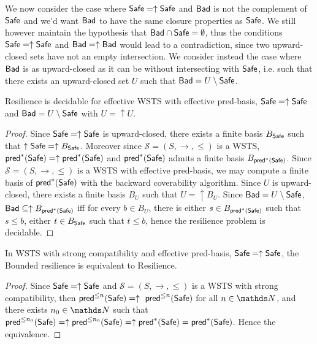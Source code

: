 We now consider the case where $\textsf{Safe} = \uparrow \textsf{Safe}$ and $\textsf{Bad}$ is not the complement of 
$\textsf{Safe}$ and we'd want $\textsf{Bad}$ to have the same closure properties as $\textsf{Safe}$.
We still however maintain the hypothesis that $\textsf{Bad} \cap \textsf{Safe} = \emptyset$, thus the conditions 
$\textsf{Safe} = \uparrow \textsf{Safe}$ and $\textsf{Bad} = \uparrow \textsf{Bad}$ would lead to a contradiction, since two upward-closed sets have not an empty intersection. We consider instead the case where $\textsf{Bad}$ is as upward-closed
as it can be without intersecting with $\textsf{Safe}$,
i.e. 
such that there exists an upward-closed set $U$
such that $\textsf{Bad} = U \setminus \textsf{Safe}$.



\begin{theorem}\label{up-up}
{\sc Resilience} is decidable for effective WSTS with effective pred-basis, $\textsf{Safe}=\uparrow \textsf{Safe}$
and $\textsf{Bad}= U \setminus \textsf{Safe}$ with $U = \uparrow U$.
\end{theorem}


\begin{proof}
Since $\textsf{Safe}=\uparrow \textsf{Safe}$ is upward-closed, there exists a finite basis $B_{ \textsf{Safe}}$ such that $\uparrow \textsf{Safe} = \uparrow B_{\textsf{Safe}}$. 
Moreover since $\mathscr{S}=(S,\rightarrow,\leq)$ is a WSTS,  $\textsf{pred}^*(\textsf{Safe})=\uparrow \textsf{pred}^*(\textsf{Safe})$ and $\textsf{pred}^*(\textsf{Safe})$ admits a finite basis $B_{\textsf{pred}^*(\textsf{Safe})}$. Since $\mathscr{S}=(S,\rightarrow,\leq)$ is a WSTS  with effective pred-basis, we may compute a finite basis of $\textsf{pred}^*(\textsf{Safe})$ with the backward coverability algorithm. 
Since $U$  is upward-closed, there exists a finite basis $B_{U}$ such that $U = \uparrow B_{U}$. %
Since $\textsf{Bad} = U \setminus \textsf{Safe}$, $\textsf{Bad} \subseteq \uparrow B_{\textsf{pred}^*(\textsf{Safe})}$ iff for every $b \in B_{U}$, there is either $s \in B_{\textsf{pred}^*(\textsf{Safe})}$ such that $s \leq b$, either $t \in B_{\textsf{Safe}}$ such that $t\leq b$,
hence the resilience problem is decidable.
\end{proof}

\begin{proposition}
In WSTS with strong compatibility and effective pred-basis,  $\textsf{Safe}=\uparrow \textsf{Safe}$, the {\sc Bounded resilience} is equivalent to {\sc Resilience}.
\end{proposition}

\begin{proof}
Since $\textsf{Safe}=\uparrow \textsf{Safe}$ and
$\mathscr{S}=(S,\rightarrow,\leq)$ is a WSTS with strong %
compatibility, then $\textsf{pred}^{\leq n}(\textsf{Safe})= \uparrow~\textsf{pred}^{\leq n}(\textsf{Safe})$ for all $n \in \N$,
and there exists $n_0 \in \N$ such that 
$\textsf{pred}^{\leq n_0}(\textsf{Safe}) = \uparrow \textsf{pred}^{\leq n_0}(\textsf{Safe}) = \uparrow \textsf{pred}^*(\textsf{Safe}) = \textsf{pred}^*(\textsf{Safe})$.
Hence the equivalence.
\end{proof}

